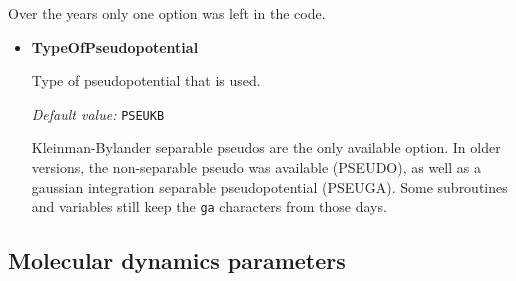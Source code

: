 \documentclass[11pt]{article}
\begin{document}
Over the years only one option was left in the code.


\begin{itemize}


\item{\bf TypeOfPseudopotential}

   Type of pseudopotential that is used.

  \textit{Default value:}  \texttt{PSEUKB}

  Kleinman-Bylander separable pseudos are the only available option.
  In older versions, the non-separable pseudo was available (PSEUDO), as
  well as a gaussian integration separable pseudopotential (PSEUGA).
  Some subroutines and variables still keep the \texttt{ga} characters from those days.

\end{itemize}


\subsection{Molecular dynamics parameters}
\end{document}
